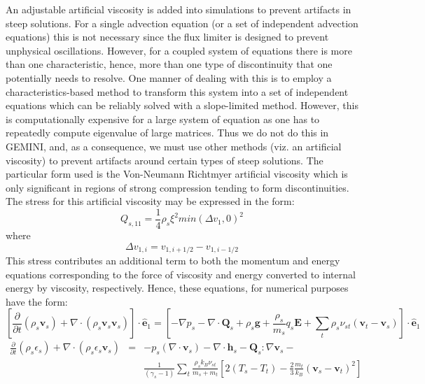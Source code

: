 \documentclass[11pt,letterpaper]{article}
\begin{document}
An adjustable artificial viscosity is added into simulations to prevent artifacts in steep solutions.  For a single advection equation (or a set of independent advection equations) this is not necessary since the flux limiter is designed to prevent unphysical oscillations.  However, for a coupled system of equations there is more than one characteristic, hence, more than one type of discontinuity that one potentially needs to resolve.  One manner of dealing with this is to employ a characteristics-based method \citep[e.g.][]{Leveque:2002} to transform this system into a set of independent equations which can be reliably solved with a slope-limited method.  However, this is computationally expensive for a large system of equation as one has to repeatedly compute eigenvalue of large matrices.  Thus we do not do this in GEMINI, and, as a consequence, we must use other methods (viz. an artificial viscosity) to prevent artifacts around certain types of steep solutions.  The particular form used is the Von-Neumann Richtmyer artificial viscosity \citep{Richtmyer:1994} which is only significant in regions of strong compression tending to form discontinuities.  The stress for this artificial viscosity may be expressed in the form:
\begin{equation}
Q_{s,11} = \frac{1}{4} \rho_s \xi^2 min(\Delta v_1,0)^2 
\end{equation}
where
\begin{equation}
\Delta v_{1,i} = v_{1,i+1/2} - v_{1,i-1/2}
\end{equation}
This stress contributes an additional term to both the momentum and energy equations corresponding to the force of viscosity and energy converted to internal energy by viscosity, respectively.  Hence, these equations, for numerical purposes have the form:
\begin{equation}
\left[ \frac{\partial }{\partial t} \left( \rho_s \mathbf{v}_s \right) + \nabla \cdot \left( \rho_s \mathbf{v}_s \mathbf{v}_s \right) \right] \cdot \hat{\mathbf{e}}_1 = \left[ -\nabla p_s - \nabla \cdot \mathbf{Q}_s + \rho_s \mathbf{g} + \frac{\rho_s} {m_s} q_s \mathbf{E} + \sum_t \rho_s \nu_{st} \left(\mathbf{v}_t - \mathbf{v}_s \right) \right] \cdot \hat{\mathbf{e}}_1 \label{eqn:stressmom}
\end{equation}
\begin{eqnarray}
\frac{\partial}{\partial t} \left( \rho_s \epsilon_s \right) + \nabla \cdot \left( \rho_s \epsilon_s \mathbf{v}_s \right) &=& - p_s (\nabla \cdot \mathbf{v}_s) - \nabla \cdot \mathbf{h}_s - \mathbf{Q}_s : \nabla \mathbf{v}_s - \\
\nonumber&& \frac{1}{(\gamma_s - 1 )}\sum_t \frac{\rho_s k_B \nu_{st}}{m_s + m_t}\left[ 2 (T_s-T_t) - \frac{2}{3} \frac{m_t}{k_B}(\mathbf{v}_s-\mathbf{v}_t)^2 \right]  \label{eqn:stressen}
\end{eqnarray}
\end{document}
